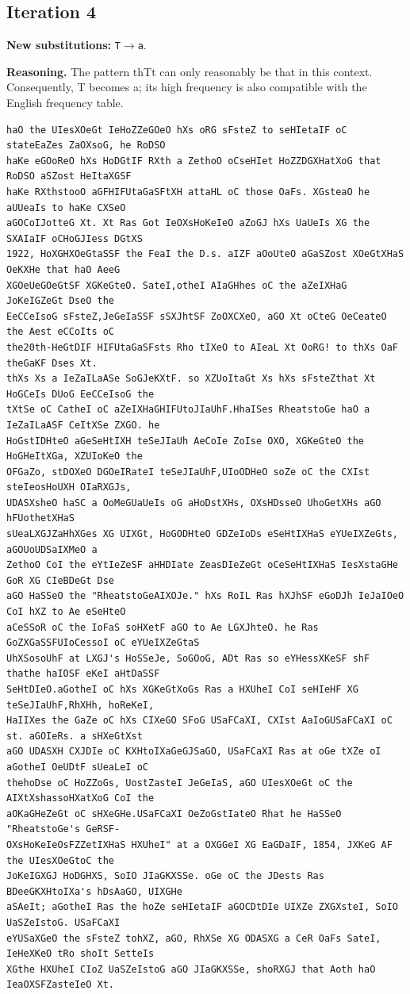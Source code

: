 \documentclass[12pt,a4paper]{article}
\begin{document}
\subsection{Iteration 4}

\noindent\textbf{New substitutions:} \texttt{T}$\rightarrow$\texttt{a}.\par
\smallskip
\noindent\textbf{Reasoning.} The pattern thTt can only reasonably be that in this context. Consequently, T becomes a; its high frequency is also compatible with the English frequency table.

\begin{lstlisting}[style=ciphertext,caption={Complete text after iteration 4}]
haO the UIesXOeGt IeHoZZeGOeO hXs oRG sFsteZ to seHIetaIF oC stateEaZes ZaOXsoG, he RoDSO
haKe eGOoReO hXs HoDGtIF RXth a ZethoO oCseHIet HoZZDGXHatXoG that RoDSO aSZost HeItaXGSF
haKe RXthstooO aGFHIFUtaGaSFtXH attaHL oC those OaFs. XGsteaO he aUUeaIs to haKe CXSeO
aGOCoIJotteG Xt. Xt Ras Got IeOXsHoKeIeO aZoGJ hXs UaUeIs XG the SXAIaIF oCHoGJIess DGtXS
1922, HoXGHXOeGtaSSF the FeaI the D.s. aIZF aOoUteO aGaSZost XOeGtXHaS OeKXHe that haO AeeG
XGOeUeGOeGtSF XGKeGteO. SateI,otheI AIaGHhes oC the aZeIXHaG JoKeIGZeGt DseO the
EeCCeIsoG sFsteZ,JeGeIaSSF sSXJhtSF ZoOXCXeO, aGO Xt oCteG OeCeateO the Aest eCCoIts oC
the20th-HeGtDIF HIFUtaGaSFsts Rho tIXeO to AIeaL Xt OoRG! to thXs OaF theGaKF Dses Xt.
thXs Xs a IeZaILaASe SoGJeKXtF. so XZUoItaGt Xs hXs sFsteZthat Xt HoGCeIs DUoG EeCCeIsoG the
tXtSe oC CatheI oC aZeIXHaGHIFUtoJIaUhF.HhaISes RheatstoGe haO a IeZaILaASF CeItXSe ZXGO. he
HoGstIDHteO aGeSeHtIXH teSeJIaUh AeCoIe ZoIse OXO, XGKeGteO the HoGHeItXGa, XZUIoKeO the
OFGaZo, stDOXeO DGOeIRateI teSeJIaUhF,UIoODHeO soZe oC the CXIst steIeosHoUXH OIaRXGJs,
UDASXsheO haSC a OoMeGUaUeIs oG aHoDstXHs, OXsHDsseO UhoGetXHs aGO hFUothetXHaS
sUeaLXGJZaHhXGes XG UIXGt, HoGODHteO GDZeIoDs eSeHtIXHaS eYUeIXZeGts, aGOUoUDSaIXMeO a
ZethoO CoI the eYtIeZeSF aHHDIate ZeasDIeZeGt oCeSeHtIXHaS IesXstaGHe GoR XG CIeBDeGt Dse
aGO HaSSeO the "RheatstoGeAIXOJe." hXs RoIL Ras hXJhSF eGoDJh IeJaIOeO CoI hXZ to Ae eSeHteO
aCeSSoR oC the IoFaS soHXetF aGO to Ae LGXJhteO. he Ras GoZXGaSSFUIoCessoI oC eYUeIXZeGtaS
UhXSosoUhF at LXGJ's HoSSeJe, SoGOoG, ADt Ras so eYHessXKeSF shF thathe haIOSF eKeI aHtDaSSF
SeHtDIeO.aGotheI oC hXs XGKeGtXoGs Ras a HXUheI CoI seHIeHF XG teSeJIaUhF,RhXHh, hoReKeI,
HaIIXes the GaZe oC hXs CIXeGO SFoG USaFCaXI, CXIst AaIoGUSaFCaXI oC st. aGOIeRs. a sHXeGtXst
aGO UDASXH CXJDIe oC KXHtoIXaGeGJSaGO, USaFCaXI Ras at oGe tXZe oI aGotheI OeUDtF sUeaLeI oC
thehoDse oC HoZZoGs, UostZasteI JeGeIaS, aGO UIesXOeGt oC the AIXtXshassoHXatXoG CoI the
aOKaGHeZeGt oC sHXeGHe.USaFCaXI OeZoGstIateO Rhat he HaSSeO "RheatstoGe's GeRSF-
OXsHoKeIeOsFZZetIXHaS HXUheI" at a OXGGeI XG EaGDaIF, 1854, JXKeG AF the UIesXOeGtoC the
JoKeIGXGJ HoDGHXS, SoIO JIaGKXSSe. oGe oC the JDests Ras BDeeGKXHtoIXa's hDsAaGO, UIXGHe
aSAeIt; aGotheI Ras the hoZe seHIetaIF aGOCDtDIe UIXZe ZXGXsteI, SoIO UaSZeIstoG. USaFCaXI
eYUSaXGeO the sFsteZ tohXZ, aGO, RhXSe XG ODASXG a CeR OaFs SateI, IeHeXKeO tRo shoIt SetteIs
XGthe HXUheI CIoZ UaSZeIstoG aGO JIaGKXSSe, shoRXGJ that Aoth haO IeaOXSFZasteIeO Xt.
\end{lstlisting}
\end{document}
